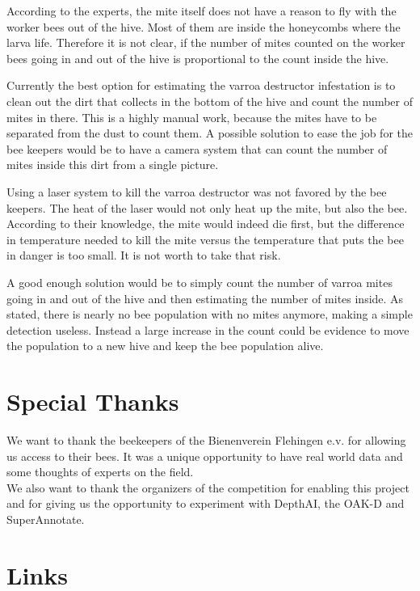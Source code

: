 \documentclass[a4paper,titlepage]{article}
\begin{document}
According to the experts, the mite itself does not have a reason to fly with the worker bees out of the hive.
Most of them are inside the honeycombs where the larva life.
Therefore it is not clear, if the number of mites counted on the worker bees going in and out of the hive is proportional to the count inside the hive.

Currently the best option for estimating the varroa destructor infestation is to clean out the dirt that collects in the bottom of the hive and count the number of mites in there.
This is a highly manual work, because the mites have to be separated from the dust to count them.
A possible solution to ease the job for the bee keepers would be to have a camera system that can count the number of mites inside this dirt from a single picture.

Using a laser system to kill the varroa destructor was not favored by the bee keepers.
The heat of the laser would not only heat up the mite, but also the bee.
According to their knowledge, the mite would indeed die first, but the difference in temperature needed to kill the mite versus the temperature that puts the bee in danger is too small.
It is not worth to take that risk.

A good enough solution would be to simply count the number of varroa mites going in and out of the hive and then estimating the number of mites inside.
As stated, there is nearly no bee population with no mites anymore, making a simple detection useless.
Instead a large increase in the count could be evidence to move the population to a new hive and keep the bee population alive.

\newpage
\section{Special Thanks}

We want to thank the beekeepers of the Bienenverein Flehingen e.v. for allowing us access to their bees.
It was a unique opportunity to have real world data and some thoughts of experts on the field.\\

We also want to thank the organizers of the competition for enabling this project and for giving us the opportunity to experiment with DepthAI, the OAK-D and SuperAnnotate.

\newpage
\section{Links}
\end{document}

